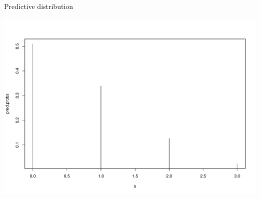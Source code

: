 \documentclass{beamer}
\begin{document}
\begin{frame}{Predictive distribution}

\begin{center}\includegraphics[scale=0.4]{05LearnBayes_files/figure-beamer/unnamed-chunk-6-1} \end{center}

\end{frame}
\end{document}

